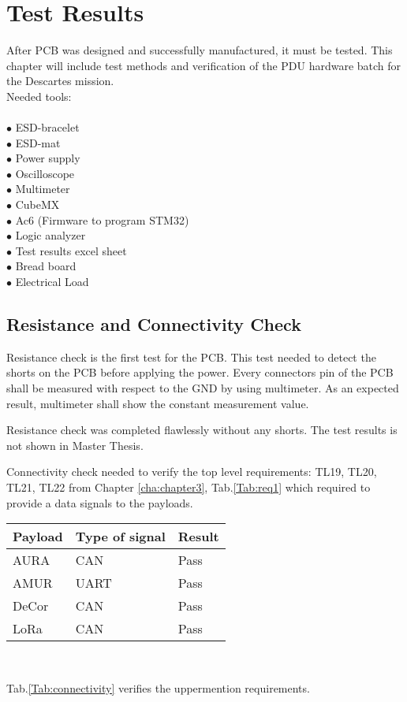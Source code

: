 \chapter{Test Results \label{6}}
After PCB was designed and successfully manufactured, it must be tested.
This chapter will include test methods and verification of the PDU hardware batch for the Descartes mission.
\\
Needed tools:\\ \\
$\bullet$ ESD-bracelet\\
$\bullet$ ESD-mat\\
$\bullet$ Power supply\\
$\bullet$ Oscilloscope\\
$\bullet$ Multimeter\\
$\bullet$ CubeMX\\
$\bullet$ Ac6 (Firmware to program STM32)\\
$\bullet$ Logic analyzer\\
$\bullet$ Test results excel sheet\\
$\bullet$ Bread board\\
$\bullet$ Electrical Load\\



\section{Resistance and Connectivity Check }


Resistance check is the first test for the PCB. This test needed to detect the shorts on the PCB before applying the power.
Every connectors pin of the PCB shall be measured with respect to the GND by using multimeter. As an expected result, multimeter shall show the constant measurement value.

Resistance check was completed flawlessly without any shorts. The test results is not shown in Master Thesis. 

Connectivity check needed to verify the top level requirements: TL19, TL20, TL21, TL22 from Chapter \ref{cha:chapter3}, Tab.\ref{Tab:req1} which required to provide a data signals to the payloads.


\begin{center}
	

	\begin{tabular}{p{3cm}p{3cm}p{2cm}} \toprule
		
	Payload & Type of signal & Result \\ \midrule
	AURA & CAN & Pass\\
	AMUR & UART & Pass\\  
	DeCor & CAN & Pass\\
	LoRa & CAN & Pass\\
	\bottomrule
\end{tabular}\\ 

\end{center}
\label{Tab:connectivity}
Tab.\ref{Tab:connectivity} verifies the uppermention requirements.
